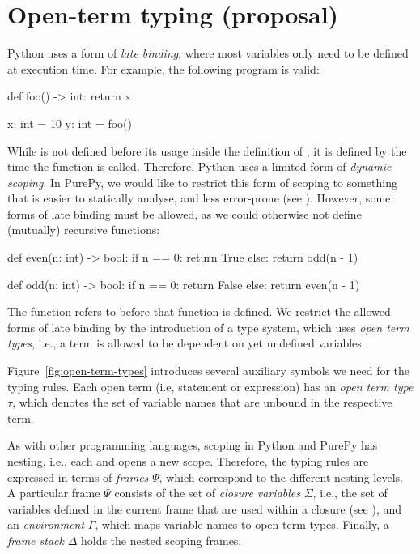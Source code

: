 \clearpage
\section{Open-term typing (proposal)}


Python uses a form of \emph{late binding}, where most variables only need to be defined at execution time. For example, 
the following program is valid: 

\begin{python}
def foo() -> int:
    return x

x: int = 10
y: int = foo()
\end{python}

While  is not defined before its usage inside the definition of , it is defined by the
time the function is called. Therefore, Python uses a limited form of \emph{dynamic scoping}. In PurePy, we would
like to restrict this form of scoping to something that is easier to statically analyse, and less error-prone 
(see ). However, some forms of late binding must be allowed, as we could otherwise not
define (mutually) recursive functions:

\begin{python}
def even(n: int) -> bool:
    if n == 0: return True
    else: return odd(n - 1)

def odd(n: int) -> bool:
    if n == 0: return False
    else: return even(n - 1)
\end{python}

The function  refers to  before that function is defined. We restrict the
allowed forms of late binding by the introduction of a type system, which uses \emph{open term types},
i.e., a term is allowed to be dependent on yet undefined variables.

Figure~\ref{fig:open-term-types} introduces several auxiliary symbols we need for the typing rules. Each
open term (i.e, statement or expression) has an \emph{open term type} $\tau$, which denotes the set of
variable names that are unbound in the respective term.

As with other programming languages, scoping in Python and PurePy has nesting, i.e., each 
and  opens a new scope. Therefore, the typing rules are expressed in terms of 
\emph{frames} $\Psi$, which correspond to the different nesting levels. A particular frame $\Psi$ consists
of the set of \emph{closure variables} $\Sigma$, i.e., the set of variables defined in the current frame
that are used within a closure (see ), and an \emph{environment} $\Gamma$,
which maps variable names to open term types. Finally, a \emph{frame stack} $\Delta$ holds the nested
scoping frames.

